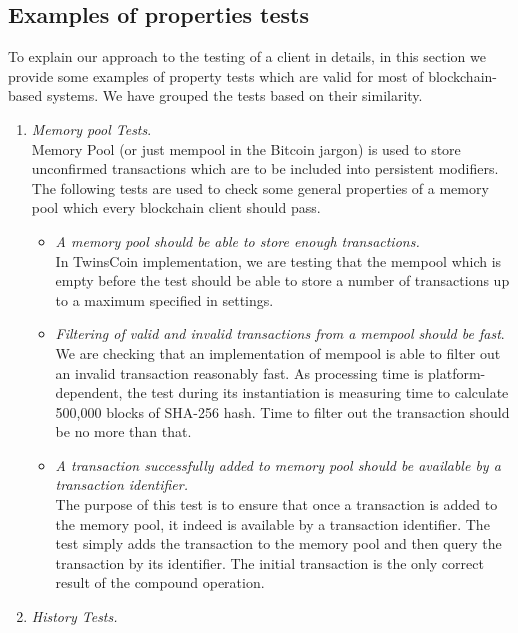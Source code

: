 
\subsection{Examples of properties tests}
\label{sec:examples}

To explain our approach to the testing of a client in details, in this section we provide some examples of property tests which are valid for most of blockchain-based systems. We have grouped the tests based on their similarity.\\

\begin{enumerate}[\IEEEsetlabelwidth{Z}]

\item \textit{Memory pool Tests}.\\
Memory Pool (or just mempool in the Bitcoin jargon) is used to store unconfirmed transactions which are to be included into persistent modifiers. The following tests are used to check some general properties of a memory pool which every blockchain client should pass.

\begin{itemize}[]

\item \textit{A memory pool should be able to store enough transactions.}\\
In TwinsCoin implementation, we are testing that the mempool which is empty before the test should be able to store a number of transactions up to a maximum specified in settings.\\

\item \textit{Filtering of valid and invalid transactions from a mempool should be fast}.\\
We are checking that an implementation of mempool is able to filter out an invalid transaction reasonably fast. As processing time is platform-dependent, the test during its instantiation is measuring time to calculate 500,000 blocks of SHA-256 hash. Time to filter out the transaction should be no more than that. \\

\item \textit{A transaction successfully added to memory pool should be available by a transaction identifier.}\\
The purpose of this test is to ensure that once a transaction is added to the memory pool, it indeed is available by a transaction identifier. The test simply adds the transaction to the memory pool and then query the transaction by its identifier. The initial transaction is the only correct result of the compound operation. \\
\end{itemize}
\item \textit{History Tests.}\\


\end{enumerate}
